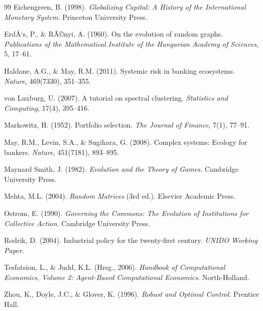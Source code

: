 ﻿\documentclass[a4paper,12pt]{article}
\theoremstyle{definition}
\begin{document}
\begin{thebibliography}{99}
Eichengreen, B. (1998).
\newblock \emph{Globalizing Capital: A History of the International Monetary System}.
\newblock Princeton University Press.

ErdÅ‘s, P., \& RÃ©nyi, A. (1960).
\newblock On the evolution of random graphs.
\newblock \emph{Publications of the Mathematical Institute of the Hungarian Academy of Sciences}, 5, 17--61.

Haldane, A.G., \& May, R.M. (2011).
\newblock Systemic risk in banking ecosystems.
\newblock \emph{Nature}, 469(7330), 351--355.

von Luxburg, U. (2007).
\newblock A tutorial on spectral clustering.
\newblock \emph{Statistics and Computing}, 17(4), 395--416.

Markowitz, H. (1952).
\newblock Portfolio selection.
\newblock \emph{The Journal of Finance}, 7(1), 77--91.

May, R.M., Levin, S.A., \& Sugihara, G. (2008).
\newblock Complex systems: Ecology for bankers.
\newblock \emph{Nature}, 451(7181), 893--895.

Maynard Smith, J. (1982).
\newblock \emph{Evolution and the Theory of Games}.
\newblock Cambridge University Press.

Mehta, M.L. (2004).
\newblock \emph{Random Matrices} (3rd ed.).
\newblock Elsevier Academic Press.

Ostrom, E. (1990).
\newblock \emph{Governing the Commons: The Evolution of Institutions for Collective Action}.
\newblock Cambridge University Press.

Rodrik, D. (2004).
\newblock Industrial policy for the twenty-first century.
\newblock \emph{UNIDO Working Paper}.

Tesfatsion, L., \& Judd, K.L. (Hrsg., 2006).
\newblock \emph{Handbook of Computational Economics, Volume 2: Agent-Based Computational Economics}.
\newblock North-Holland.

Zhou, K., Doyle, J.C., \& Glover, K. (1996).
\newblock \emph{Robust and Optimal Control}.
\newblock Prentice Hall.

\end{thebibliography}
\end{document}
